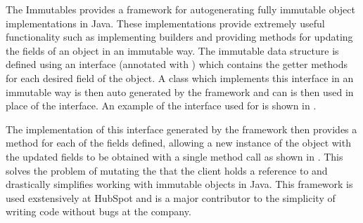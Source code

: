 

The Immutables \cite{immutablesJava} provides a framework for autogenerating fully immutable object implementations in Java. These implementations provide extremely useful functionality such as implementing builders and providing methods for updating the fields of an object in an immutable way. The immutable data structure is defined using an interface (annotated with ) which contains the getter methods for each desired field of the object. A class which implements this interface in an immutable way is then auto generated by the framework and can is then used in place of the interface. An example of the interface used for  is shown in .



The implementation of this interface generated by the framework then provides a  method for each of the fields defined, allowing a new instance of the object with the updated fields to be obtained with a single method call as shown in . This solves the problem of mutating the  that the client holds a reference to and drastically simplifies working with immutable objects in Java. This framework is used exstensively at HubSpot and is a major contributor to the simplicity of writing code without bugs at the company.




